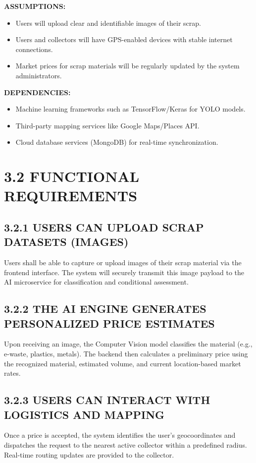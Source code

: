\textbf{ASSUMPTIONS:}
\begin{itemize}
    \item Users will upload clear and identifiable images of their scrap.
    \item Users and collectors will have GPS-enabled devices with stable internet connections.
    \item Market prices for scrap materials will be regularly updated by the system administrators.
\end{itemize}

\textbf{DEPENDENCIES:}
\begin{itemize}
    \item Machine learning frameworks such as TensorFlow/Keras for YOLO models.
    \item Third-party mapping services like Google Maps/Places API.
    \item Cloud database services (MongoDB) for real-time synchronization.
\end{itemize}

\section{3.2 FUNCTIONAL REQUIREMENTS}

\subsection{3.2.1 USERS CAN UPLOAD SCRAP DATASETS (IMAGES)}
Users shall be able to capture or upload images of their scrap material via the frontend interface. The system will securely transmit this image payload to the AI microservice for classification and conditional assessment.

\subsection{3.2.2 THE AI ENGINE GENERATES PERSONALIZED PRICE ESTIMATES}
Upon receiving an image, the Computer Vision model classifies the material (e.g., e-waste, plastics, metals). The backend then calculates a preliminary price using the recognized material, estimated volume, and current location-based market rates.

\subsection{3.2.3 USERS CAN INTERACT WITH LOGISTICS AND MAPPING}
Once a price is accepted, the system identifies the user's geocoordinates and dispatches the request to the nearest active collector within a predefined radius. Real-time routing updates are provided to the collector.

